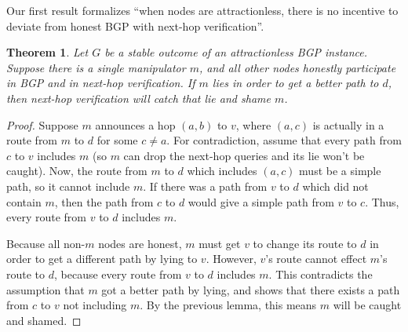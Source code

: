 \documentclass[10pt]{article}
\newtheorem{theorem}{Theorem}
\begin{document}
  Our first result formalizes ``when nodes are attractionless,
  there is no incentive to deviate from honest BGP with next-hop verification''.
  \begin{theorem}
    Let $G$ be a stable outcome of an attractionless BGP instance.
    Suppose there is a single manipulator $m$,
    and all other nodes honestly participate in BGP and in next-hop verification.
    If $m$ lies in order to get a better path to $d$,
    then next-hop verification will catch that lie and shame $m$.
  \end{theorem}
  \begin{proof}
    Suppose $m$ announces a hop $(a,b)$ to $v$, where $(a,c)$ is actually in
    a route from $m$ to $d$ for some $c\ne a$.
    For contradiction, assume that every path from $c$ to $v$ includes $m$
    (so $m$ can drop the next-hop queries and its lie won't be caught).
    Now, the route from $m$ to $d$ which includes $(a,c)$ must be a simple
    path, so it cannot include $m$.
    If there was a path from $v$ to $d$ which did not contain $m$, then the
    path from $c$ to $d$ would give a simple path from $v$ to $c$.
    Thus, every route from $v$ to $d$ includes $m$.

    Because all non-$m$ nodes are honest, $m$ must get $v$ to change its route
    to $d$ in order to get a different path by lying to $v$.
    However, $v$'s route cannot effect $m$'s route to $d$, because
    every route from $v$ to $d$ includes $m$.
    This contradicts the assumption that $m$ got a better path by lying,
    and shows that there exists a path from $c$ to $v$ not including $m$.
    By the previous lemma, this means $m$ will be caught and shamed.
  \end{proof}
\end{document}
